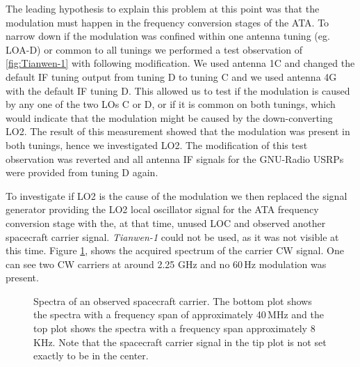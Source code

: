 \documentclass[12pt]{article}
\begin{document}
The leading hypothesis to explain this problem at this point was that the modulation must happen in the frequency conversion stages of the ATA. To narrow down if the modulation was confined within one antenna tuning (eg. LOA-D) or common to all tunings we performed a test observation of \ref{fig:Tianwen-1} with following modification. We used antenna 1C and changed the default IF tuning output from tuning D to tuning C and we used antenna 4G with the default IF tuning D. This allowed us to test if the modulation is caused by any one of the two LOs C or D, or if it is common on both tunings, which would indicate that the modulation might be caused by the down-converting LO2.
The result of this measurement showed that the modulation was present in both tunings, hence we investigated LO2. The modification of this test observation was reverted and all antenna IF signals for the GNU-Radio USRPs were provided from tuning D again.

To investigate if LO2 is the cause of the modulation we then replaced the signal generator providing the LO2 local oscillator signal for the ATA frequency conversion stage with the, at that time, unused LOC and observed another spacecraft carrier signal. \textit{Tianwen-1} could not be used, as it was not visible at this time. Figure \ref{fig:GNU-Obs2}, shows the acquired spectrum of the carrier CW signal. One can see two CW carriers at around 2.25 GHz and no 60\,Hz modulation was present.


%
\begin{figure}[h]
\caption{Spectra of an observed spacecraft carrier. The bottom plot shows the spectra with a frequency span of approximately 40\,MHz and the top plot shows the spectra with a frequency span approximately 8\,KHz. Note that the spacecraft carrier signal in the tip plot is not set exactly to be in the center.  }
\label{fig:GNU-Obs2}
\end{figure}
%
\end{document}
